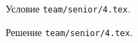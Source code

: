 \problem{}
Условие \texttt{team/senior/4.tex}.

\solution Решение \texttt{team/senior/4.tex}.
\endproblem
